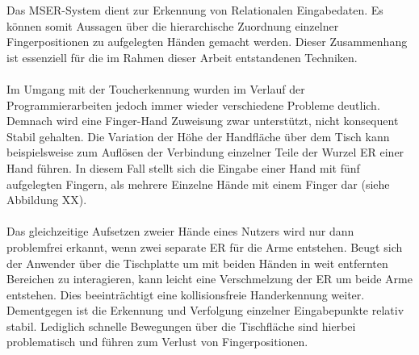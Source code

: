 Das MSER-System dient zur Erkennung von Relationalen Eingabedaten. Es können somit Aussagen über die hierarchische Zuordnung einzelner Fingerpositionen zu aufgelegten Händen gemacht werden. Dieser Zusammenhang ist essenziell für die im Rahmen dieser Arbeit entstandenen Techniken. 
\\\\ 
Im Umgang mit der Toucherkennung wurden im Verlauf der Programmierarbeiten jedoch immer wieder verschiedene Probleme deutlich. Demnach wird eine Finger-Hand Zuweisung zwar unterstützt, nicht konsequent Stabil gehalten. Die Variation der Höhe der Handfläche über dem Tisch kann beispielsweise zum Auflösen der Verbindung einzelner Teile der Wurzel ER einer Hand führen. In diesem Fall stellt sich die Eingabe einer Hand mit fünf aufgelegten Fingern, als mehrere Einzelne Hände mit einem Finger dar (siehe Abbildung XX). 
\\\\
Das gleichzeitige Aufsetzen zweier Hände eines Nutzers wird nur dann problemfrei erkannt, wenn zwei separate ER für die Arme entstehen. Beugt sich der Anwender über die Tischplatte um mit beiden Händen in weit entfernten Bereichen zu interagieren, kann leicht eine Verschmelzung der ER um beide Arme entstehen. Dies beeinträchtigt eine kollisionsfreie Handerkennung weiter. Dementgegen ist die Erkennung und Verfolgung einzelner Eingabepunkte relativ stabil. Lediglich schnelle Bewegungen über die Tischfläche sind hierbei problematisch und führen zum Verlust von Fingerpositionen.